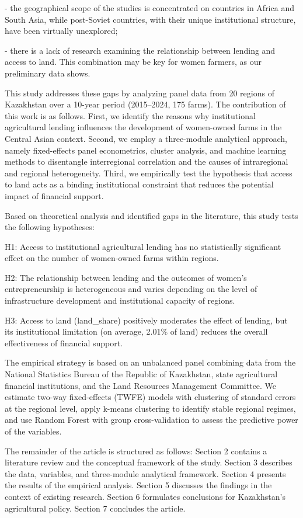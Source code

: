 \documentclass[
]{article}
\begin{document}
- the geographical scope of the studies is concentrated on countries in
Africa and South Asia, while post-Soviet countries, with their unique
institutional structure, have been virtually unexplored;

- there is a lack of research examining the relationship between lending
and access to land. This combination may be key for women farmers, as
our preliminary data shows.

This study addresses these gaps by analyzing panel data from 20 regions
of Kazakhstan over a 10-year period (2015--2024, 175 farms). The
contribution of this work is as follows. First, we identify the reasons
why institutional agricultural lending influences the development of
women-owned farms in the Central Asian context. Second, we employ a
three-module analytical approach, namely fixed-effects panel
econometrics, cluster analysis, and machine learning methods to
disentangle interregional correlation and the causes of intraregional
and regional heterogeneity. Third, we empirically test the hypothesis
that access to land acts as a binding institutional constraint that
reduces the potential impact of financial support.

Based on theoretical analysis and identified gaps in the literature,
this study tests the following hypotheses:

H1: Access to institutional agricultural lending has no statistically
significant effect on the number of women-owned farms within regions.

H2: The relationship between lending and the outcomes of women's
entrepreneurship is heterogeneous and varies depending on the level of
infrastructure development and institutional capacity of regions.

H3: Access to land (land\_share) positively moderates the effect of
lending, but its institutional limitation (on average, 2.01\% of land)
reduces the overall effectiveness of financial support.

The empirical strategy is based on an unbalanced panel combining data
from the National Statistics Bureau of the Republic of Kazakhstan, state
agricultural financial institutions, and the Land Resources Management
Committee. We estimate two-way fixed-effects (TWFE) models with
clustering of standard errors at the regional level, apply k-means
clustering to identify stable regional regimes, and use Random Forest
with group cross-validation to assess the predictive power of the
variables.

The remainder of the article is structured as follows: Section 2
contains a literature review and the conceptual framework of the study.
Section 3 describes the data, variables, and three-module analytical
framework. Section 4 presents the results of the empirical analysis.
Section 5 discusses the findings in the context of existing research.
Section 6 formulates conclusions for Kazakhstan's agricultural policy.
Section 7 concludes the article.
\end{document}

